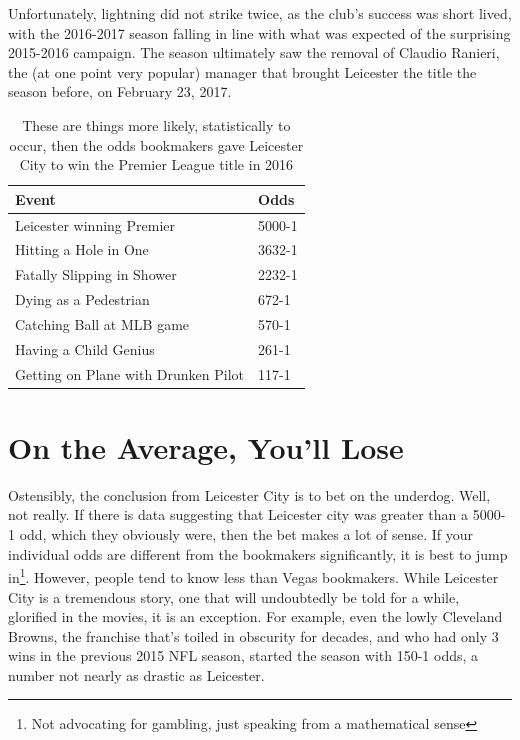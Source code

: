 \documentclass[12pt,twoside]{book}
\begin{document}
Unfortunately, lightning did not strike twice, as the club's success was short lived, with the 2016-2017 season falling in line with what was expected of the surprising 2015-2016 campaign. The season ultimately saw the removal of Claudio Ranieri, the (at one point very popular) manager that brought Leicester the title the season before, on February 23, 2017.
\begin{table}[t!]
	\centering
	\begin{tabular}{ll}
		\toprule
		Event                                     & Odds    \\ \midrule
		Leicester winning  Premier  & 5000-1  \\ 
		Hitting a Hole in One                     & 3632-1  \\ 
		Fatally Slipping in Shower                & 2232-1  \\ 
		Dying as a Pedestrian                     & 672-1   \\ 
		Catching Ball at MLB game                 & 570-1   \\ 
		Having a Child Genius &261-1 \\ 
		Getting on Plane with Drunken Pilot       & 117-1 \\ \bottomrule
	\end{tabular}
	\caption{These are things more likely, statistically to occur, then the odds bookmakers gave Leicester City to win the Premier League title in 2016\cite{leicester7}}
	\label{tab:leic}
\end{table}
\section{On the Average, You'll Lose}

Ostensibly, the conclusion from Leicester City is to bet on the underdog.  Well, not really.  If there is data suggesting that Leicester city was greater than a 5000-1 odd, which they obviously were, then the bet makes a lot of sense.  If your individual odds are different from the bookmakers significantly, it is best to jump in\footnote{Not advocating for gambling, just speaking from a mathematical sense}.  However, people tend to know less than Vegas bookmakers.  While Leicester City is a tremendous story, one that will undoubtedly be told for a while, glorified in the movies, it is an exception.  For example, even the lowly Cleveland Browns, the franchise that's toiled in obscurity for decades, and who had only 3 wins in the previous 2015 NFL season, started the season with 150-1 odds, a number not nearly as drastic as Leicester\cite{leicester}.  
\end{document}
